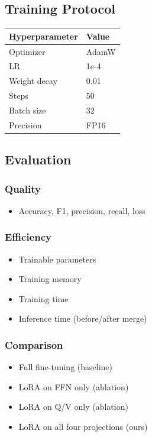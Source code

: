 \subsection{Training Protocol}

\begin{table}[H]
\centering
\small
\begin{tabular}{ll}
\toprule
\textbf{Hyperparameter} & \textbf{Value} \\
\midrule
Optimizer & AdamW \\
LR & 1e-4 \\
Weight decay & 0.01 \\
Steps & 50 \\
Batch size & 32 \\
Precision & FP16 \\
\bottomrule
\end{tabular}
\end{table}

\subsection{Evaluation}

\subsubsection{Quality}
\begin{itemize}
\item Accuracy, F1, precision, recall, loss

\end{itemize}
\subsubsection{Efficiency}
\begin{itemize}
\item Trainable parameters
\item Training memory
\item Training time
\item Inference time (before/after merge)

\end{itemize}
\subsubsection{Comparison}
\begin{itemize}
\item Full fine-tuning (baseline)
\item LoRA on FFN only (ablation)
\item LoRA on Q/V only (ablation)
\item LoRA on all four projections (ours)

\end{itemize}
